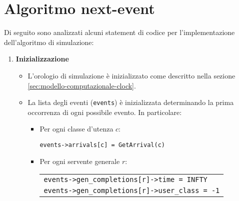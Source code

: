 \section{Algoritmo next-event}\label{sec:modello-computazionale-algoritmo}
Di seguito sono analizzati alcuni statement di codice per l'implementazione dell'algoritmo di simulazione:
\begin{enumerate}[label=Step \arabic*), align=left, leftmargin=*]
\item \textbf{Inizializzazione}
\begin{itemize}
\item L'orologio di simulazione è inizializzato come descritto nella sezione \ref{sec:modello-computazionale-clock}.
\item La lista degli eventi (\texttt{events}) è inizializzata determinando la prima occorrenza di ogni possibile evento. In particolare:
\begin{itemize}
\item Per ogni classe d'utenza $c$:
\begin{center}
\texttt{events->arrivals[c] = GetArrival(c)}
\end{center}

\item Per ogni servente generale $r$:
\begin{center}
\begin{tabular}{l}
\texttt{events->gen\_completions[r]->time = INFTY} \\
\texttt{events->gen\_completions[r]->user\_class = -1}
\end{tabular}
\end{center}


\end{itemize}
\end{itemize}
\end{enumerate}

